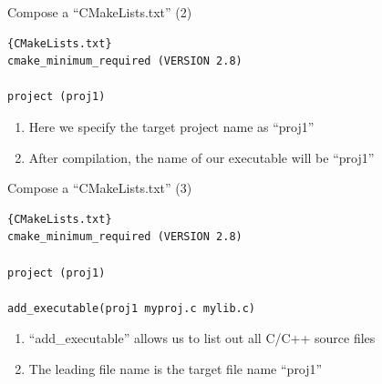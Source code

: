 \begin{frame}[fragile]{Compose a ``CMakeLists.txt'' (2)}
\begin{lstlisting}[linewidth=0.95\linewidth, firstnumber= 1, xleftmargin=0.02\linewidth]{CMakeLists.txt}
cmake_minimum_required (VERSION 2.8)

project (proj1)
\end{lstlisting}

\begin{enumerate}
	\item {Here we specify the target project name as ``proj1''}
	\vspace{0.15in}
	\item {After compilation, the name of our executable will be ``proj1''}
\end{enumerate}
\end{frame}

\begin{frame}[fragile]{Compose a ``CMakeLists.txt'' (3)}
\begin{lstlisting}[linewidth=0.95\linewidth, firstnumber= 1, xleftmargin=0.02\linewidth]{CMakeLists.txt}
cmake_minimum_required (VERSION 2.8)

project (proj1)

add_executable(proj1 myproj.c mylib.c)
\end{lstlisting}

\begin{enumerate}
	\item {``add\_executable'' allows us to list out all C/C++ source files}
	\vspace{0.15in}
	\item {The leading file name is the target file name ``proj1''}
\end{enumerate}
\end{frame}

